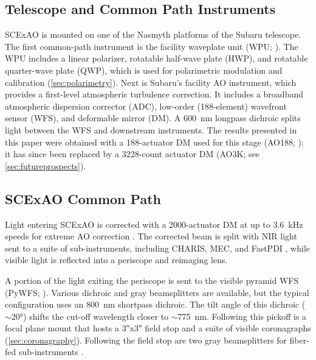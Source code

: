 \subsection{Telescope and Common Path Instruments}

SCExAO is mounted on one of the Nasmyth platforms of the Subaru telescope. The first common-path instrument is the facility waveplate unit (WPU; \citealp{watanabe_near-infrared_2018}). The WPU includes a linear polarizer, rotatable half-wave plate (HWP), and rotatable quarter-wave plate (QWP), which is used for polarimetric modulation and calibration (\autoref{sec:polarimetry}). Next is Subaru's facility AO instrument, which provides a first-level atmospheric turbulence correction. It includes a broadband atmospheric dispersion corrector (ADC), low-order (188-element) wavefront sensor (WFS), and deformable mirror (DM). A \SI{600}{\nano\meter} longpass dichroic splits light between the WFS and downstream instruments. The results presented in this paper were obtained with a 188-actuator DM used for this stage (AO188; \citealp{minowa_performance_2010}): it has since been replaced by a 3228-count actuator DM (AO3K; see \autoref{sec:futureprospects}). 

\subsection{SCExAO Common Path}

Light entering SCExAO is corrected with a 2000-actuator DM at up to \SI{3.6}{\kilo\hertz} speeds for extreme AO correction \citep{lozi_new_2020,ahn_scexao_2021}. The corrected beam is split with NIR light sent to a suite of sub-instruments, including CHARIS, MEC, and FastPDI \citep{groff_charis_2015,steiger_probing_2022,lozi_status_2020}, while visible light is reflected into a periscope and reimaging lens.

A portion of the light exiting the periscope is sent to the visible pyramid WFS (PyWFS; \citealp{lozi_visible_2019}). Various dichroic and gray beamsplitters are available, but the typical configuration uses an \SI{800}{\nano\meter} shortpass dichroic. The tilt angle of this dichroic ($\sim$\ang{20}) shifts the cut-off wavelength closer to $\sim$\SI{775}{\nano\meter}. Following this pickoff is a focal plane mount that hosts a \ang{;;3}x\ang{;;3} field stop and a suite of visible coronagraphs (\autoref{sec:coronagraphy}). Following the field stop are two gray beamsplitters for fiber-fed sub-instruments \citep{vievard_single-aperture_2023,vievard_photonic_2023}.

